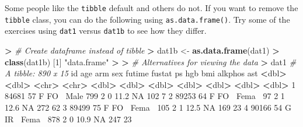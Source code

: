 \documentclass[
]{book}
\newenvironment{Shaded}{\begin{snugshade}}{\end{snugshade}}
\newcommand{\CommentTok}[1]{\textcolor[rgb]{0.56,0.35,0.01}{\textit{#1}}}
\newcommand{\DecValTok}[1]{\textcolor[rgb]{0.00,0.00,0.81}{#1}}
\newcommand{\ErrorTok}[1]{\textcolor[rgb]{0.64,0.00,0.00}{\textbf{#1}}}
\newcommand{\FloatTok}[1]{\textcolor[rgb]{0.00,0.00,0.81}{#1}}
\newcommand{\KeywordTok}[1]{\textcolor[rgb]{0.13,0.29,0.53}{\textbf{#1}}}
\newcommand{\NormalTok}[1]{#1}
\newcommand{\OperatorTok}[1]{\textcolor[rgb]{0.81,0.36,0.00}{\textbf{#1}}}
\newcommand{\OtherTok}[1]{\textcolor[rgb]{0.56,0.35,0.01}{#1}}
\newcommand{\StringTok}[1]{\textcolor[rgb]{0.31,0.60,0.02}{#1}}
\begin{document}
Some people like the \texttt{tibble} default and others do not. If you want to remove the \texttt{tibble} class, you can do the following using \texttt{as.data.frame()}. Try some of the exercises using \texttt{dat1} versus \texttt{dat1b} to see how they differ.

\begin{Shaded}
\begin{Highlighting}[]
\OperatorTok{>}\StringTok{ }\CommentTok{# Create dataframe instead of tibble}
\ErrorTok{>}\StringTok{ }\NormalTok{dat1b <-}\StringTok{ }\KeywordTok{as.data.frame}\NormalTok{(dat1)}
\OperatorTok{>}\StringTok{ }\KeywordTok{class}\NormalTok{(dat1b)}
\NormalTok{[}\DecValTok{1}\NormalTok{] }\StringTok{"data.frame"}
\OperatorTok{>}\StringTok{ }
\ErrorTok{>}\StringTok{ }\CommentTok{# Alternatives for viewing the data}
\ErrorTok{>}\StringTok{ }\NormalTok{dat1}
\CommentTok{# A tibble: 890 x 15}
\NormalTok{      id   age arm   sex   futime fustat    ps   hgb   bmi alkphos   ast}
   \OperatorTok{<}\NormalTok{dbl}\OperatorTok{>}\StringTok{ }\ErrorTok{<}\NormalTok{dbl}\OperatorTok{>}\StringTok{ }\ErrorTok{<}\NormalTok{chr}\OperatorTok{>}\StringTok{ }\ErrorTok{<}\NormalTok{chr}\OperatorTok{>}\StringTok{  }\ErrorTok{<}\NormalTok{dbl}\OperatorTok{>}\StringTok{  }\ErrorTok{<}\NormalTok{dbl}\OperatorTok{>}\StringTok{ }\ErrorTok{<}\NormalTok{dbl}\OperatorTok{>}\StringTok{ }\ErrorTok{<}\NormalTok{dbl}\OperatorTok{>}\StringTok{ }\ErrorTok{<}\NormalTok{dbl}\OperatorTok{>}\StringTok{   }\ErrorTok{<}\NormalTok{dbl}\OperatorTok{>}\StringTok{ }\ErrorTok{<}\NormalTok{dbl}\OperatorTok{>}
\StringTok{ }\DecValTok{1} \DecValTok{84681}    \DecValTok{57}\NormalTok{ F FO}\OperatorTok{~}\StringTok{ }\NormalTok{Male     }\DecValTok{799}      \DecValTok{2}     \DecValTok{0}  \FloatTok{11.2}    \OtherTok{NA}     \DecValTok{102}     \DecValTok{7}
 \DecValTok{2} \DecValTok{89253}    \DecValTok{64}\NormalTok{ F FO}\OperatorTok{~}\StringTok{ }\NormalTok{Fema}\OperatorTok{~}\StringTok{     }\DecValTok{97}      \DecValTok{2}     \DecValTok{1}  \FloatTok{12.6}    \OtherTok{NA}     \DecValTok{272}    \DecValTok{62}
 \DecValTok{3} \DecValTok{89499}    \DecValTok{75}\NormalTok{ F FO}\OperatorTok{~}\StringTok{ }\NormalTok{Fema}\OperatorTok{~}\StringTok{    }\DecValTok{105}      \DecValTok{2}     \DecValTok{1}  \FloatTok{12.5}    \OtherTok{NA}     \DecValTok{169}    \DecValTok{23}
 \DecValTok{4} \DecValTok{90166}    \DecValTok{54}\NormalTok{ G IR}\OperatorTok{~}\StringTok{ }\NormalTok{Fema}\OperatorTok{~}\StringTok{    }\DecValTok{878}      \DecValTok{2}     \DecValTok{0}  \FloatTok{10.9}    \OtherTok{NA}     \DecValTok{247}    \DecValTok{23}

\end{Highlighting}
\end{Shaded}
\end{document}
